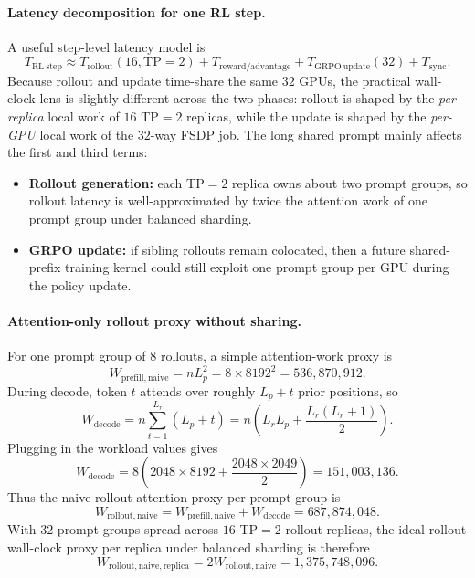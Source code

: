 \documentclass[11pt]{article}
\begin{document}
\paragraph{Latency decomposition for one RL step.}
A useful step-level latency model is
\[
T_{\mathrm{RL\ step}}
\approx
T_{\mathrm{rollout}}(16, \mathrm{TP}=2)
+
T_{\mathrm{reward/advantage}}
+
T_{\mathrm{GRPO\ update}}(32)
+
T_{\mathrm{sync}}.
\]
Because rollout and update time-share the same $32$ GPUs, the practical
wall-clock lens is slightly different across the two phases: rollout is shaped
by the \emph{per-replica} local work of $16$ TP$=2$ replicas, while the update
is shaped by the \emph{per-GPU} local work of the $32$-way FSDP job. The long
shared prompt mainly affects the first and third terms:
\begin{itemize}
    \item \textbf{Rollout generation:} each TP$=2$ replica owns about two prompt
    groups, so rollout latency is well-approximated by twice the attention work
    of one prompt group under balanced sharding.
    \item \textbf{GRPO update:} if sibling rollouts remain colocated, then a
    future shared-prefix training kernel could still exploit one prompt group per
    GPU during the policy update.
\end{itemize}

\paragraph{Attention-only rollout proxy without sharing.}
For one prompt group of $8$ rollouts, a simple attention-work proxy is
\[
W_{\mathrm{prefill,naive}} = n L_p^2
= 8 \times 8192^2
= 536{,}870{,}912.
\]
During decode, token $t$ attends over roughly $L_p + t$ prior positions, so
\[
W_{\mathrm{decode}}
= n \sum_{t=1}^{L_r} (L_p + t)
= n \left(L_r L_p + \frac{L_r(L_r + 1)}{2}\right).
\]
Plugging in the workload values gives
\[
W_{\mathrm{decode}}
= 8 \left(2048 \times 8192 + \frac{2048 \times 2049}{2}\right)
= 151{,}003{,}136.
\]
Thus the naive rollout attention proxy per prompt group is
\[
W_{\mathrm{rollout,naive}}
=
W_{\mathrm{prefill,naive}} + W_{\mathrm{decode}}
=
687{,}874{,}048.
\]
With $32$ prompt groups spread across $16$ TP$=2$ rollout replicas, the ideal
rollout wall-clock proxy per replica under balanced sharding is therefore
\[
W_{\mathrm{rollout,naive,replica}} = 2 W_{\mathrm{rollout,naive}} = 1{,}375{,}748{,}096.
\]
\end{document}
